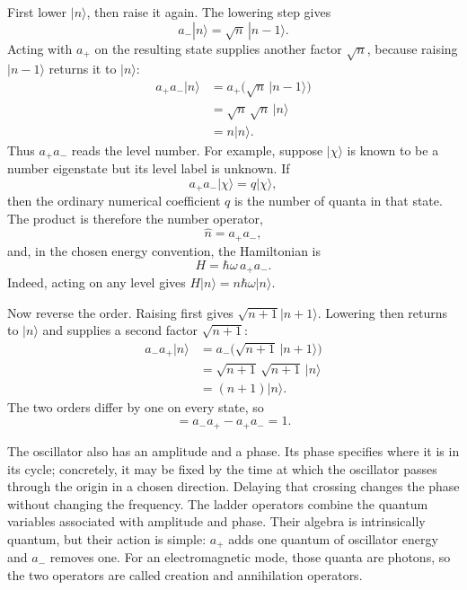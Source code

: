 First lower \(|n\rangle\), then raise it again. The lowering step gives
\begin{equation}
a_-|n\rangle=\sqrt n\,|n-1\rangle.
\end{equation}
Acting with \(a_+\) on the resulting state supplies another factor \(\sqrt n\), because raising \(|n-1\rangle\) returns it to \(|n\rangle\):
\begin{align}
a_+a_-|n\rangle
&=a_+\bigl(\sqrt n\,|n-1\rangle\bigr)\\
&=\sqrt n\,\sqrt n\,|n\rangle\\
&=n|n\rangle.
\end{align}
Thus \(a_+a_-\) reads the level number. For example, suppose \(|\chi\rangle\) is known to be a number eigenstate but its level label is unknown. If
\begin{equation}
a_+a_-|\chi\rangle=q|\chi\rangle,
\end{equation}
then the ordinary numerical coefficient \(q\) is the number of quanta in that state. The product is therefore the number operator,
\begin{equation}
\hat n=a_+a_-,
\end{equation}
and, in the chosen energy convention, the Hamiltonian is
\begin{equation}
H=\hbar\omega\,a_+a_-.
\end{equation}
Indeed, acting on any level gives \(H|n\rangle=n\hbar\omega|n\rangle\).

Now reverse the order. Raising first gives \(\sqrt{n+1}|n+1\rangle\). Lowering then returns to \(|n\rangle\) and supplies a second factor \(\sqrt{n+1}\):
\begin{align}
a_-a_+|n\rangle
&=a_-\bigl(\sqrt{n+1}\,|n+1\rangle\bigr)\\
&=\sqrt{n+1}\,\sqrt{n+1}\,|n\rangle\\
&=(n+1)|n\rangle.
\end{align}
The two orders differ by one on every state, so
\begin{equation}
[a_-,a_+]=a_-a_+-a_+a_-=1.
\end{equation}

The oscillator also has an amplitude and a phase. Its phase specifies where it is in its cycle; concretely, it may be fixed by the time at which the oscillator passes through the origin in a chosen direction. Delaying that crossing changes the phase without changing the frequency. The ladder operators combine the quantum variables associated with amplitude and phase. Their algebra is intrinsically quantum, but their action is simple: \(a_+\) adds one quantum of oscillator energy and \(a_-\) removes one. For an electromagnetic mode, those quanta are photons, so the two operators are called creation and annihilation operators.

